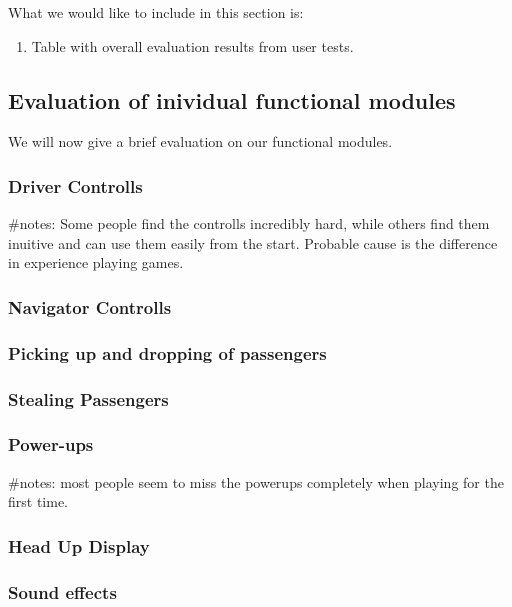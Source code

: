 What we would like to include in this section is:
\begin{enumerate}
	\item Table with overall evaluation results from user tests.
	
\end{enumerate}

\subsection{Evaluation of inividual functional modules}

We will now give a brief evaluation on our functional modules.

\subsubsection*{Driver Controlls}

#notes: Some people find the controlls incredibly hard, while others find them inuitive and can use them easily from the start. Probable cause is the difference in experience playing games.

\subsubsection*{Navigator Controlls}

\subsubsection*{Picking up and dropping of passengers}

\subsubsection*{Stealing Passengers}

\subsubsection*{Power-ups}

#notes: most people seem to miss the powerups completely when playing for the first time.

\subsubsection*{Head Up Display}

\subsubsection*{Sound effects}

